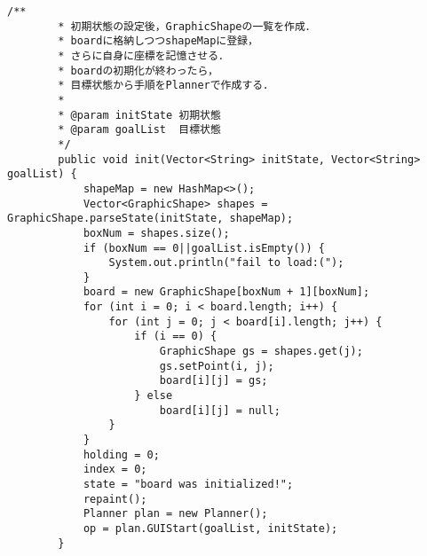 \documentclass{jarticle}
\begin{document}
    \begin{lstlisting}[caption=DrawCanvas.java中のinitメソッド(一部抜粋)]
        /**
        * 初期状態の設定後，GraphicShapeの一覧を作成． 
        * boardに格納しつつshapeMapに登録，
        * さらに自身に座標を記憶させる．
        * boardの初期化が終わったら，
        * 目標状態から手順をPlannerで作成する．
        * 
        * @param initState 初期状態
        * @param goalList  目標状態
        */
        public void init(Vector<String> initState, Vector<String> goalList) {
            shapeMap = new HashMap<>();
            Vector<GraphicShape> shapes = GraphicShape.parseState(initState, shapeMap);
            boxNum = shapes.size();
            if (boxNum == 0||goalList.isEmpty()) {
                System.out.println("fail to load:(");
            }
            board = new GraphicShape[boxNum + 1][boxNum];
            for (int i = 0; i < board.length; i++) {
                for (int j = 0; j < board[i].length; j++) {
                    if (i == 0) {
                        GraphicShape gs = shapes.get(j);
                        gs.setPoint(i, j);
                        board[i][j] = gs;
                    } else
                        board[i][j] = null;
                }
            }
            holding = 0;
            index = 0;
            state = "board was initialized!";
            repaint();
            Planner plan = new Planner();
            op = plan.GUIStart(goalList, initState);
        }
    \end{lstlisting}
\end{document}
